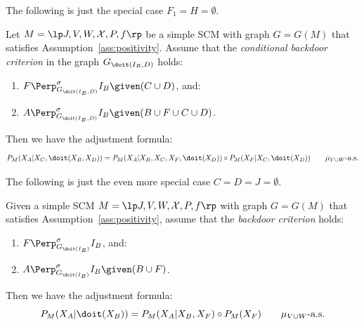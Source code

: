 The following is just the special case $F_1=H=\emptyset$.
\begin{Cor}\label{thm:backdoor-cond-int-scms}
  Let $M = \lt \Sin, \Send, \Srnd, \CX, P, f \rt$ be a simple SCM with graph $G = G(M)$ that satisfies Assumption~\ref{ass:positivity}.
  Assume that the \emph{conditional backdoor criterion} in the graph $G_{\doit(I_B,D)}$ holds:
\begin{enumerate}
    \item $\displaystyle F \Perp^\sigma_{G_{\doit(I_B,D)}} I_B  \given (C \cup D)$, and:
    \item $\displaystyle A \Perp^\sigma_{G_{\doit(I_B,D)}} I_B  \given (B \cup F \cup C \cup D)$.
\end{enumerate}
Then we have the adjustment formula:
\[ P_{M}(X_A|X_C,\doit(X_B,X_D)) = 
    P_{M}(X_A|X_B,X_C,X_F,\doit(X_D)) \circ P_{M}(X_F|X_C,\doit(X_D)) \qquad \text{$\mu_{V\cup W}$-a.s.}
\]
\end{Cor}
The following is just the even more special case $C=D=J= \emptyset$.
\begin{Cor}\label{thm:backdoor-scms}
 Given a simple SCM $M = \lt \Sin, \Send, \Srnd, \CX, P, f \rt$ with graph $G = G(M)$ that satisfies Assumption~\ref{ass:positivity},
 assume that the \emph{backdoor criterion} holds:
\begin{enumerate}
    \item $\displaystyle F \Perp^\sigma_{G_{\doit(I_B)}} I_B$, and:
    \item $\displaystyle A \Perp^\sigma_{G_{\doit(I_B)}} I_B  \given (B \cup F)$.
\end{enumerate}
Then we have the adjustment formula:
\[ P_{M}(X_A|\doit(X_B)) = 
    P_{M}(X_A|X_B,X_F) \circ P_{M}(X_F) \qquad \text{$\mu_{V\cup W}$-a.s.}
\]
\end{Cor}
